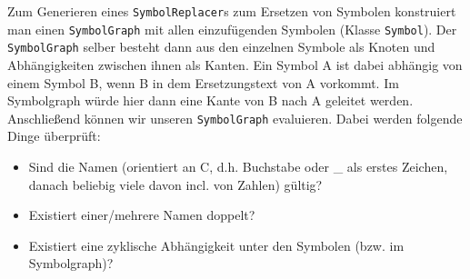 Zum Generieren eines \texttt{SymbolReplacer}s zum Ersetzen von Symbolen konstruiert man einen \texttt{SymbolGraph} mit allen einzufügenden Symbolen (Klasse \texttt{Symbol}). Der \texttt{SymbolGraph} selber besteht dann aus den einzelnen Symbole als Knoten und Abhängigkeiten zwischen ihnen als Kanten. Ein Symbol A ist dabei abhängig von einem Symbol B, wenn B in dem Ersetzungstext von A vorkommt. Im Symbolgraph würde hier dann eine Kante von B nach A geleitet werden. Anschließend können wir unseren \texttt{SymbolGraph} evaluieren. Dabei werden folgende Dinge überprüft:
\begin {itemize}
\item Sind die Namen (orientiert an C, d.h. Buchstabe oder _ als erstes Zeichen, danach beliebig viele davon incl. von Zahlen) gültig?
\item Existiert einer/mehrere Namen doppelt?
\item Existiert eine zyklische Abhängigkeit unter den Symbolen (bzw. im Symbolgraph)?
\end {itemize}

